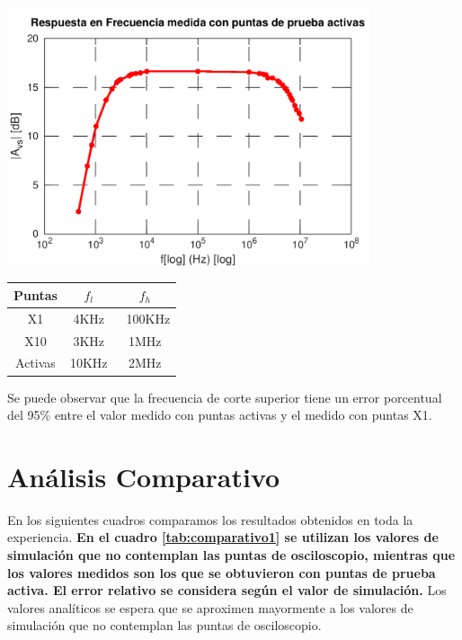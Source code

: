 \documentclass[a4paper, 10pt, spanish]{article}
\begin{document}
\begin{center}
  \includegraphics[width=0.8\textwidth]{activas.png}
  \label{fig:activas_med}
\end{center}

\begin{center}
  \begin{tabular}{|c|c|c|}
    \hline
    Puntas & $f_l$ & $f_h$ \\
    \hline
    X1 & 4KHz & ~100KHz \\
    \hline
    X10 & 3KHz & 1MHz\\
    \hline
    Activas & 10KHz& 2MHz\\
    \hline
  \end{tabular}
  \label{tab:rta_frec_med}
\end{center}
Se puede observar que la frecuencia de corte superior tiene un error porcentual del 95\% entre el valor medido con puntas activas y el medido con puntas X1.

\section{Análisis Comparativo}
En los siguientes cuadros comparamos los resultados obtenidos en toda la experiencia. \textbf{En el cuadro \ref{tab:comparativo1} se utilizan los valores de simulación que no contemplan las puntas de osciloscopio, mientras que los valores medidos son los que se obtuvieron con puntas de prueba activa. El error relativo se considera según el valor de simulación.} Los valores analíticos se espera que se aproximen mayormente a los valores de simulación que no contemplan las puntas de osciloscopio.
\end{document}
